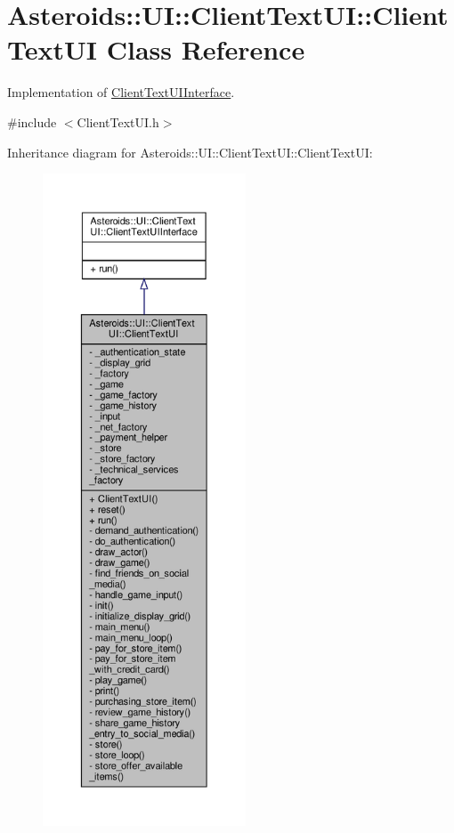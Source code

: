 \hypertarget{classAsteroids_1_1UI_1_1ClientTextUI_1_1ClientTextUI}{}\section{Asteroids\+:\+:UI\+:\+:Client\+Text\+UI\+:\+:Client\+Text\+UI Class Reference}
\label{classAsteroids_1_1UI_1_1ClientTextUI_1_1ClientTextUI}


Implementation of \hyperlink{classAsteroids_1_1UI_1_1ClientTextUI_1_1ClientTextUIInterface}{Client\+Text\+U\+I\+Interface}.  




{\ttfamily \#include $<$Client\+Text\+U\+I.\+h$>$}



Inheritance diagram for Asteroids\+:\+:UI\+:\+:Client\+Text\+UI\+:\+:Client\+Text\+UI\+:
\nopagebreak
\begin{figure}[H]
\begin{center}
\leavevmode
\includegraphics[height=550pt]{classAsteroids_1_1UI_1_1ClientTextUI_1_1ClientTextUI__inherit__graph}
\end{center}
\end{figure}


